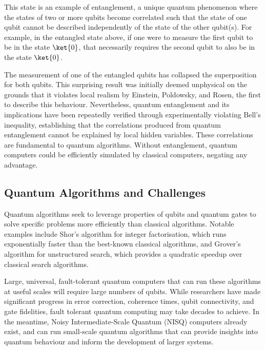 This state is an example of entanglement, a unique quantum phenomenon where the states of two or more qubits become correlated such that the state of one qubit cannot be described independently of the state of the other qubit(s). For example, in the entangled state above, if one were to measure the first qubit to be in the state $\ket{0}$, that necessarily requires the second qubit to also be in the state $\ket{0}$. 

The measurement of one of the entangled qubits has collapsed the superposition for both qubits. This surprising result was initially deemed unphysical on the grounds that it violates local realism by Einstein, Poldowsky, and Rosen, the first to describe this behaviour\cite{epr_paradox}. Nevertheless, quantum entanglement and its implications have been repeatedly verified through experimentally violating Bell's inequality\cite{bell_theorem}, establishing that the correlations produced from quantum entanglement cannot be explained by local hidden variables\cite{bell_inequality_1,bell_inequality_2,bell_inequality_3}.
These correlations are fundamental to quantum algorithms. Without entanglement, quantum computers could be efficiently simulated by classical computers, negating any advantage\cite{Jozsa_2003}.

\subsection{Quantum Algorithms and Challenges}

Quantum algorithms seek to leverage properties of qubits and quantum gates to solve specific problems more efficiently than classical algorithms. Notable examples include Shor's algorithm for integer factorisation\cite{Shor_algorithm}, which runs exponentially faster than the best-known classical algorithms, and Grover's algorithm for unstructured search\cite{grover_search}, which provides a quadratic speedup over classical search algorithms.

Large, universal, fault-tolerant quantum computers that can run these algorithms at useful scales will require large numbers of qubits. While researchers have made significant progress in error correction, coherence times, qubit connectivity, and gate fidelities, fault tolerant quantum computing may take decades to achieve. In the meantime, Noisy Intermediate-Scale Quantum (NISQ) computers already exist, and can run small-scale quantum algorithms that can provide insights into quantum behaviour and inform the development of larger systems.

